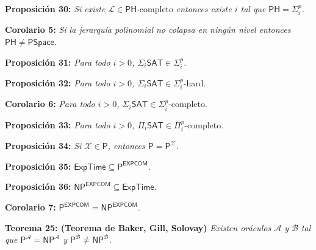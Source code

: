 \documentclass{article}
\begin{document}
\begin{flushleft}
  \textbf{Proposición 30:}
  \textit{Si existe $\mathcal{L} \in \mathsf{PH}$}-completo \textit{entonces existe $i$ tal que $\mathsf{PH}
  = \Sigma^p_i$.}
\end{flushleft}

\begin{flushleft}
  \textbf{Corolario 5:}
  \textit{Si la jerarquía polinomial no colapsa en ningún nivel entonces $\mathsf{PH} \neq \mathsf{PSpace}$.}
\end{flushleft}

\begin{flushleft}
  \textbf{Proposición 31:}
  \textit{Para todo $i > 0$, $\Sigma_i \mathsf{SAT} \in \Sigma^p_i$.}
\end{flushleft}

\begin{flushleft}
  \textbf{Proposición 32:}
  \textit{Para todo $i > 0$, $\Sigma_i \mathsf{SAT} \in \Sigma^p_i$}-hard.
\end{flushleft}

\begin{flushleft}
  \textbf{Corolario 6:}
  \textit{Para todo $i > 0$, $\Sigma_i \mathsf{SAT} \in \Sigma^p_i$}-completo.
\end{flushleft}

\begin{flushleft}
  \textbf{Proposición 33:}
  \textit{Para todo $i > 0$, $\Pi_i \mathsf{SAT} \in \Pi^p_i$}-completo.
\end{flushleft}

\begin{flushleft}
  \textbf{Proposición 34:}
  \textit{Si $\mathcal{X} \in \mathsf{P}$, entonces $\mathsf{P} = \mathsf{P}^\mathcal{X}$.}
\end{flushleft}

\begin{flushleft}
  \textbf{Proposición 35:}
  $\mathsf{ExpTime \subseteq P^{EXPCOM}}$.
\end{flushleft}

\begin{flushleft}
  \textbf{Proposición 36:}
  $\mathsf{NP^{EXPCOM} \subseteq ExpTime}$.
\end{flushleft}

\begin{flushleft}
  \textbf{Corolario 7:}
  $\mathsf{P^{EXPCOM} = NP^{EXPCOM}}$.
\end{flushleft}

\begin{flushleft}
  \textbf{Teorema 25: \hypertarget{baker}{\textcolor{Bittersweet}{(Teorema de Baker, Gill, Solovay)}}}
  \textit{Existen oráculos $\mathcal{A}$ y $\mathcal{B}$ tal que $\mathsf{P}^\mathcal{A} = \mathsf{NP}^
  \mathcal{A}$ y $\mathsf{P}^\mathcal{B} \neq \mathsf{NP}^\mathcal{B}$.}
\end{flushleft}
\end{document}
